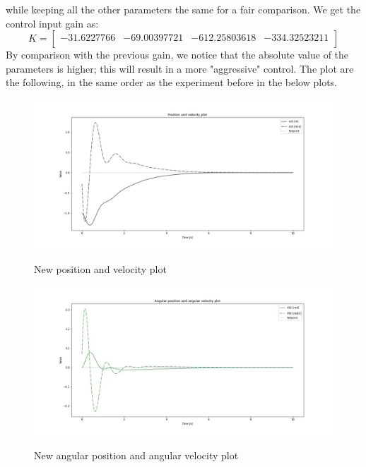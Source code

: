 while keeping all the other parameters the same for a fair comparison. We get the control input gain as:
\begin{equation}
    K = \begin{bmatrix}
        -31.6227766  & -69.00397721 & -612.25803618  & -334.32523211\\
    \end{bmatrix}
\end{equation}
By comparison with the previous gain, we notice that the absolute value of the parameters is higher; this will result in a more "aggressive" control.
The plot are the following, in the same order as the experiment before in the below plots.
\begin{figure}[h!]
    \centering
    \includegraphics[width=\textwidth]{images/2-pendulum_pos_vel.jpg}
    \label{fig:pen_pos}
    \caption{New position and velocity plot}
\end{figure}
\begin{figure}[h!]
    \centering
    \includegraphics[width=\textwidth]{images/2-pendulum_angular_pos_vel.jpg}
    \label{fig:pen_an}
    \caption{New angular position and angular velocity plot}

\end{figure}
